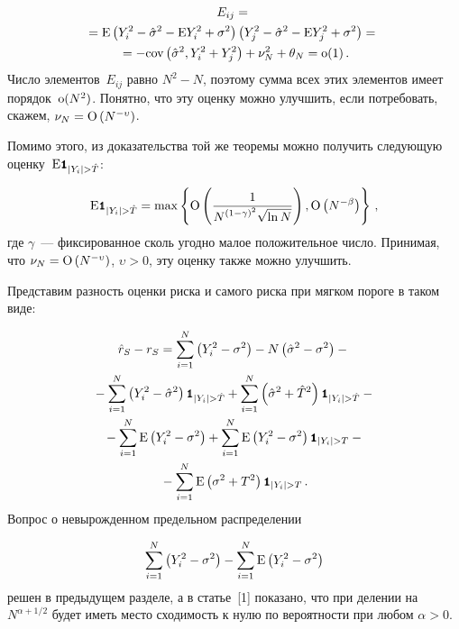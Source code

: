 \begin{multicols}{2}
\noindent
\begin{multline*}
E_{ij}={}\\
\!\!{}=\textrm{E}\left(Y_i^2-\hat\sigma^2-\textrm{E} Y_i^2+\sigma^2\right)\left(Y_j^2-\hat\sigma^2-\textrm{E} Y_j^2+\sigma^2\right)={}\\
{}=-\textrm{cov}\left(\hat\sigma^2,Y_i^2+Y_j^2\right)+\nu_N^2+\theta_N=\textrm{o}(1)\,.
\end{multline*}
Число элементов~$E_{ij}$ равно $N^2-N$, поэтому сумма всех этих элементов имеет порядок~$\textrm{o}(N^2)$. 
Понятно, что эту оценку можно улучшить, если потребовать, скажем, $\nu_N=\textrm{O}\left(N^{-\upsilon}\right)$.

Помимо этого, из доказательства той же теоремы можно получить следующую оценку~$\expct\indYighT$:
\vspace*{-3pt}

\noindent
\begin{equation*}
\expct\indYighT=\max\left\{ \Obig\left(\fr{1}{N^{(1-\gamma)^2}\sqrt{\ln N}}\right), 
\Obig\left(N^{-\beta}\right) \right\}\,,
\end{equation*}
где $\gamma$~--- фиксированное сколь угодно малое положительное число. 
Принимая, что $\nu_N=\textrm{O}\left(N^{-\upsilon}\right)$, $\upsilon>0$, эту оценку также можно улучшить.

Представим разность оценки риска и самого риска при мягком пороге в таком виде:
\vspace*{-6pt}

\noindent
\begin{multline}
\label{eq_hrSmrSsplit}
\hat r_S-r_S=\sum_{i=1}^{N}\left(Y_i^2-\sigma^2\right)-N\left(\hsig-\sigma^2\right)-{}\\
{}-\sum_{i=1}^{N}\left(Y_i^2-\hsig\right)\indYighT+\sum_{i=1}^{N}\left(\hsig+\hat T^2\right)\indYighT-{}\\
{}-\sum_{i=1}^{N}\expct\left(Y_i^2-\sigma^2\right)+\sum_{i=1}^{N}\expct\left(Y_i^2-\sigma^2\right)\indYigT-{}\\
{}-\sum_{i=1}^{N}\expct\left(\sigma^2+T^2\right)\indYigT\,.
\end{multline}
Вопрос о невырожденном предельном распределении 
\vspace*{-3pt}

\noindent
$$
\sum\limits_{i=1}^{N}\left(Y_i^2-\sigma^2\right)-\sum\limits_{i=1}^{N}\textrm{E}\left(Y_i^2-\sigma^2\right)
$$ 
решен в предыдущем разделе, а в статье~[1] показано, что при делении на~$N^{\alpha+1/2}$ 
будет иметь мес\-то сходимость к нулю по вероятности при любом $\alpha>0$.
\pagebreak


\end{multicols}
